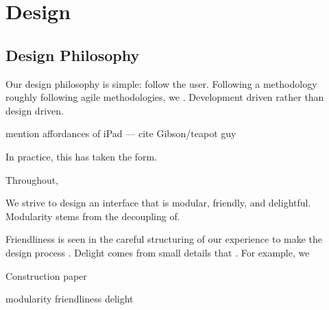 \chapter{Design}

\section{Design Philosophy}\label{design-philosophy}

Our design philosophy is simple: follow the user. Following a
methodology roughly following agile methodologies, we . Development
driven rather than design driven.

mention affordances of iPad --- cite Gibson/teapot guy

In practice, this has taken the form.

Throughout,

We strive to design an interface that is modular, friendly, and
delightful. Modularity stems from the decoupling of.

Friendliness is seen in the careful structuring of our experience to
make the design process . Delight comes from small details that . For
example, we

Construction paper

modularity friendliness delight
